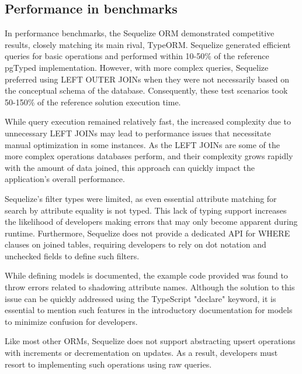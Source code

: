 \subsection{Performance in benchmarks}

In performance benchmarks, the Sequelize ORM demonstrated competitive results,
closely matching its main rival, TypeORM. Sequelize generated efficient queries
for basic operations and performed within 10-50\% of the reference pgTyped
implementation. However, with more complex queries, Sequelize preferred using
LEFT OUTER JOINs when they were not necessarily based on the conceptual schema
of the database. Consequently, these test scenarios took 50-150\% of the
reference solution execution time.

While query execution remained relatively fast, the increased complexity due to
unnecessary LEFT JOINs may lead to performance issues that necessitate manual
optimization in some instances. As the LEFT JOINs are some of the more complex
operations databases perform, and their complexity grows rapidly with the amount
of data joined, this approach can quickly impact the application's overall
performance.

Sequelize's filter types were limited, as even essential attribute matching for
search by attribute equality is not typed. This lack of typing support increases
the likelihood of developers making errors that may only become apparent during
runtime. Furthermore, Sequelize does not provide a dedicated API for WHERE
clauses on joined tables, requiring developers to rely on dot notation and
unchecked fields to define such filters.

While defining models is documented, the example code provided was found to
throw errors related to shadowing attribute names. Although the solution to this
issue can be quickly addressed using the TypeScript "declare" keyword, it is
essential to mention such features in the introductory documentation for models
to minimize confusion for developers.

Like most other ORMs, Sequelize does not support abstracting upsert operations
with increments or decrementation on updates. As a result, developers must
resort to implementing such operations using raw queries.